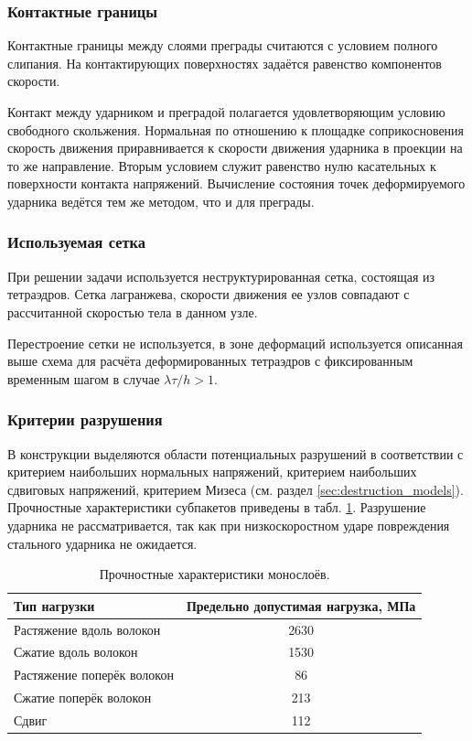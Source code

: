 \subsubsection*{Контактные границы}

Контактные границы между слоями преграды считаются с условием полного слипания. На контактирующих поверхностях задаётся равенство компонентов скорости.

Контакт между ударником и преградой полагается удовлетворяющим условию свободного скольжения. Нормальная по отношению к площадке соприкосновения скорость движения приравнивается к скорости движения ударника в проекции на то же направление. Вторым условием служит равенство нулю касательных к поверхности контакта напряжений. Вычисление состояния точек деформируемого ударника ведётся тем же методом, что и для преграды.

\subsubsection*{Используемая сетка}

При решении задачи используется неструктурированная сетка, состоящая из тетраэдров. Сетка лагранжева, скорости движения ее узлов совпадают с рассчитанной скоростью тела в данном узле.

Перестроение сетки не используется, в зоне деформаций используется описанная выше схема для расчёта деформированных тетраэдров с фиксированным временным шагом в случае $\lambda \tau / h > 1$.

\subsubsection*{Критерии разрушения}

В конструкции выделяются области потенциальных разрушений в соответствии с критерием наибольших нормальных напряжений, критерием наибольших сдвиговых напряжений, критерием Мизеса (см. раздел \ref{sec:destruction_models}). Прочностные характеристики субпакетов приведены в табл. \ref{tbl:max_stresses}. Разрушение ударника не рассматривается, так как при низкоскоростном ударе повреждения стального ударника не ожидается.

\begin{table}[h]
\centering
\begin{tabular}{|l|c|}
\hline
Тип нагрузки & Предельно допустимая нагрузка, МПа \\
\hline
Растяжение вдоль волокон & 2630 \\
Сжатие вдоль волокон & 1530 \\
Растяжение поперёк волокон & 86 \\
Сжатие поперёк волокон & 213 \\
Сдвиг & 112 \\
\hline
\end{tabular}
\caption{Прочностные характеристики монослоёв.}
\label{tbl:max_stresses}
\end{table}

